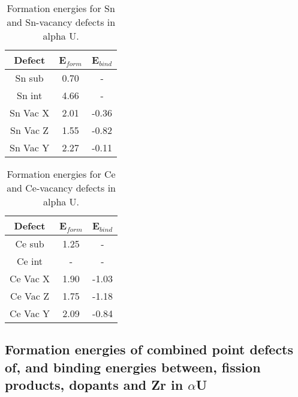 \documentclass[review]{elsarticle}
\begin{document}
\begin{table}[h!]
\caption{Formation energies for Sn and Sn-vacancy defects in alpha U.}
\label{tab:Eforms}
\begin{center}
\begin{tabular}{|c|c|c|}
     \hline
      Defect & E$_{form}$ & E$_{bind}$ \\
     \hline
     Sn sub & 0.70 & - \\
     Sn int & 4.66 & - \\
     Sn Vac X & 2.01 & -0.36 \\
     Sn Vac Z & 1.55 & -0.82 \\
     Sn Vac Y & 2.27 & -0.11 \\
       \hline
\end{tabular}
\end{center}
\label{default}
\end{table}%


\begin{table}[h!]
\caption{Formation energies for Ce and Ce-vacancy defects in alpha U.}
\label{tab:Eforms}
\begin{center}
\begin{tabular}{|c|c|c|}
     \hline
      Defect & E$_{form}$ & E$_{bind}$ \\
     \hline
     Ce sub & 1.25 & - \\
     Ce int & - & - \\
     Ce Vac X & 1.90 & -1.03 \\
     Ce Vac Z & 1.75 & -1.18 \\
     Ce Vac Y & 2.09 & -0.84 \\
       \hline
\end{tabular}
\end{center}
\label{default}
\end{table}%

\FloatBarrier

\subsection{Formation energies of combined point defects of, and binding energies between, fission products, dopants and Zr in $\alpha$U}
\end{document}
